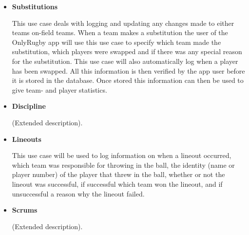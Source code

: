 \documentclass[a4paper,12pt]{report}
\begin{document}
\begin{itemize}
\begin{flushleft}
		\end{flushleft}
		\begin{center}
		\end{center}
\newpage
	\item \textbf{Substitutions}
		\begin{flushleft}
		 This use case deals with logging and updating any changes made to either teams on-field teams. When a team makes a substitution the user of the OnlyRugby app will use this use case to specify which team made the substitution, which players were swapped and if there was any special reason for the substitution. This use case will also automatically log when a player has been swapped. All this information is then verified by the app user before it is stored in the database. Once stored this information can then be used to give team- and player statistics.
		\end{flushleft}
		\begin{center}
		\end{center}
	\item \textbf{Discipline}
		\begin{flushleft}
		(Extended description).
		\end{flushleft}
		\begin{center}
		\end{center}
	\item \textbf{Lineouts}
		\begin{flushleft}
		This use case will be used to log information on when a lineout occurred, which team was responsible for throwing in the ball, the identity (name or player number) of the player that threw in the ball, whether or not the lineout was successful, if successful which team won the lineout, and if unsuccessful a reason why the lineout failed.
		\end{flushleft}
		\begin{center}
		\end{center}
	\item \textbf{Scrums}
		\begin{flushleft}
		(Extended description).
		\end{flushleft}

\end{itemize}
\end{document}
